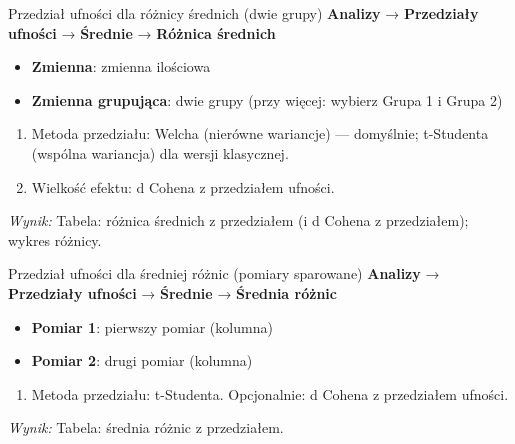 \documentclass[
  polish,
  10pt,
  a4paper,
  DIV=11,
  numbers=noendperiod]{scrartcl}
\newcommand{\jmenu}[1]{{\color{upwraccent}\small #1}}
\begin{document}
\begin{jbox}{Przedział ufności dla różnicy średnich (dwie grupy)}\label{w:ci-roznica-srednich}
\jmenu{\textbf{Analizy} → \textbf{Przedziały ufności} → \textbf{Średnie} → \textbf{Różnica średnich}}

\begin{itemize}
\item[$\triangleright$] \textbf{Zmienna}: zmienna ilościowa
\item[$\triangleright$] \textbf{Zmienna grupująca}: dwie grupy (przy więcej: wybierz Grupa 1 i Grupa 2)
\end{itemize}
\begin{enumerate}
\item Metoda przedziału: Welcha (nierówne wariancje) — domyślnie; t-Studenta (wspólna wariancja) dla wersji klasycznej.
\item Wielkość efektu: d Cohena z przedziałem ufności.
\end{enumerate}
\textit{Wynik:} Tabela: różnica średnich z przedziałem (i d Cohena z przedziałem); wykres różnicy.

\end{jbox}

\begin{jbox}{Przedział ufności dla średniej różnic (pomiary sparowane)}\label{w:ci-srednia-roznic}
\jmenu{\textbf{Analizy} → \textbf{Przedziały ufności} → \textbf{Średnie} → \textbf{Średnia różnic}}

\begin{itemize}
\item[$\triangleright$] \textbf{Pomiar 1}: pierwszy pomiar (kolumna)
\item[$\triangleright$] \textbf{Pomiar 2}: drugi pomiar (kolumna)
\end{itemize}
\begin{enumerate}
\item Metoda przedziału: t-Studenta. Opcjonalnie: d Cohena z przedziałem ufności.
\end{enumerate}
\textit{Wynik:} Tabela: średnia różnic z przedziałem.

\end{jbox}
\end{document}
